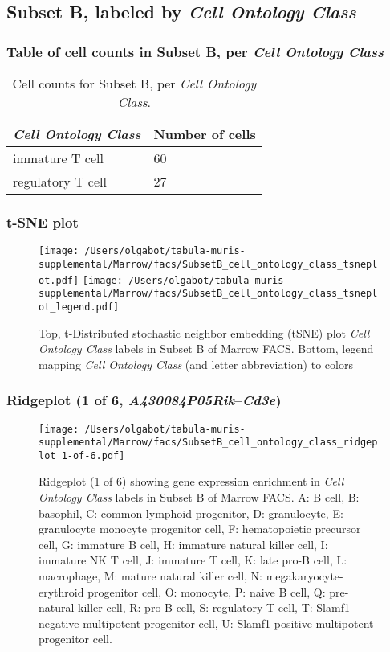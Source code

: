 \clearpage

\subsection{Subset B, labeled by \emph{Cell Ontology Class}}
\subsubsection{Table of cell counts in Subset B, per \emph{Cell Ontology Class}}\begin{table}[h]
\centering
\label{my-label}
\begin{tabular}{@{}ll@{}}
\toprule

\emph{Cell Ontology Class}& Number of cells \\ \midrule
immature T cell & 60 \\

regulatory T cell & 27 \\
\bottomrule
\end{tabular}
\caption{Cell counts for Subset B, per \emph{Cell Ontology Class}.}
\end{table}

\clearpage
\subsubsection{t-SNE plot}
\begin{figure}[h]
\centering
\texttt{[image: /Users/olgabot/tabula-muris-supplemental/Marrow/facs/SubsetB\_cell\_ontology\_class\_tsneplot.pdf]}
\texttt{[image: /Users/olgabot/tabula-muris-supplemental/Marrow/facs/SubsetB\_cell\_ontology\_class\_tsneplot\_legend.pdf]}
\caption{Top, t-Distributed stochastic neighbor embedding (tSNE) plot  \emph{Cell Ontology Class} labels in Subset B of Marrow FACS. Bottom, legend mapping \emph{Cell Ontology Class} (and letter abbreviation) to colors}
\end{figure}


\clearpage

\subsubsection{Ridgeplot (1 of 6, \emph{A430084P05Rik}--\emph{Cd3e})}
\begin{figure}[h]
\centering
\texttt{[image: /Users/olgabot/tabula-muris-supplemental/Marrow/facs/SubsetB\_cell\_ontology\_class\_ridgeplot\_1-of-6.pdf]}

\caption{ Ridgeplot (1 of 6)  showing gene expression enrichment in \emph{Cell Ontology Class} labels in Subset B of Marrow FACS. A: B cell, B: basophil, C: common lymphoid progenitor, D: granulocyte, E: granulocyte monocyte progenitor cell, F: hematopoietic precursor cell, G: immature B cell, H: immature natural killer cell, I: immature NK T cell, J: immature T cell, K: late pro-B cell, L: macrophage, M: mature natural killer cell, N: megakaryocyte-erythroid progenitor cell, O: monocyte, P: naive B cell, Q: pre-natural killer cell, R: pro-B cell, S: regulatory T cell, T: Slamf1-negative multipotent progenitor cell, U: Slamf1-positive multipotent progenitor cell.}
\end{figure}


